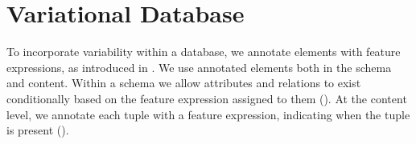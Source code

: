 \chapter{Variational Database}
\label{ch:vdb}

To incorporate variability within a database, we annotate elements with feature expressions,
as introduced in . We use annotated elements both in the schema and content.
Within a schema we allow attributes and relations to exist 
conditionally based on the feature expression assigned to them ().
At the content level, we annotate each tuple with a feature expression, indicating when the tuple 
is present (). 


%



%

